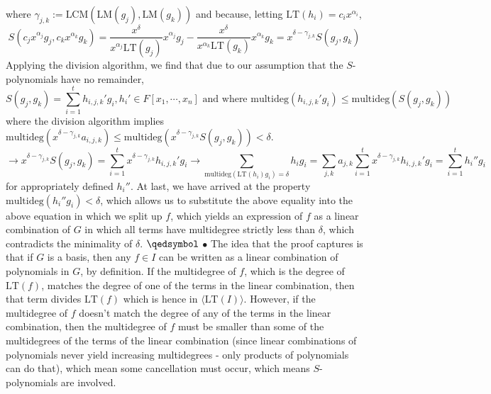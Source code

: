 \documentclass{article}
\begin{document}
where $ \gamma_{j, k} := \text{LCM}(\text{LM}(g_j), \text{LM}(g_k)) $ and because, letting $ \text{LT}(h_i) = c_i x^{\alpha_i} $,
$$ S(c_j x^{\alpha_j} g_j, c_k x^{\alpha_k} g_k) = \frac{x^\delta}{x^{\alpha_j} \text{LT}(g_j)} x^{\alpha_j} g_j - \frac{x^\delta}{x^{\alpha_k} \text{LT}(g_k)} x^{\alpha_k} g_k = x^{\delta - \gamma_{j, k}} S(g_j, g_k) $$
Applying the division algorithm, we find that due to our assumption that the $ S $-polynomials have no remainder,
$$ S(g_j, g_k) = \sum_{i = 1}^t h_{i, j, k}' g_i, h_i' \in F[x_1, \cdots, x_n] \text{ and where } \text{multideg}(h_{i, j, k}' g_i) \leq \text{multideg}(S(g_j, g_k)) $$
where the division algorithm implies $ \text{multideg}(x^{\delta - \gamma_{j, k}} a_{i, j, k}) \leq \text{multideg}(x^{\delta - \gamma_{j, k}} S(g_j, g_k)) < \delta $.
$$ \rightarrow x^{\delta - \gamma_{j, k}} S(g_j, g_k) = \sum_{i = 1}^t x^{\delta - \gamma_{j, k}} h_{i, j, k}' g_i \rightarrow \sum_{\text{multideg}(\text{LT}(h_i) g_i) = \delta} h_i g_i = \sum_{j, k} a_{j, k} \sum_{i = 1}^t x^{\delta - \gamma_{j, k}} h_{i, j, k}' g_i = \sum_{i = 1}^t h_i'' g_i $$
for appropriately defined $ h_i'' $. At last, we have arrived at the property $ \text{multideg}(h_i'' g_i) < \delta $, which allows us to substitute the above equality into the above equation in which we split up $ f $, which yields an expression of $ f $ as a linear combination of $ G $ in which all terms have multidegree strictly less than $ \delta $, which contradicts the minimality of $ \delta $. $ \qedsymbol $
\newline
\indent $ \bullet $ The idea that the proof captures is that if $ G $ is a basis, then any $ f \in I $ can be written as a linear combination of polynomials in $ G $, by definition. If the multidegree of $ f $, which is the degree of $ \text{LT}(f) $, matches the degree of one of the terms in the linear combination, then that term divides $ \text{LT}(f) $ which is hence in $ \langle \text{LT}(I) \rangle $. However, if the multidegree of $ f $ doesn't match the degree of any of the terms in the linear combination, then the multidegree of $ f $ must be smaller than some of the multidegrees of the terms of the linear combination (since linear combinations of polynomials never yield increasing multidegrees - only products of polynomials can do that), which mean some cancellation must occur, which means $ S $-polynomials are involved.
\end{document}
